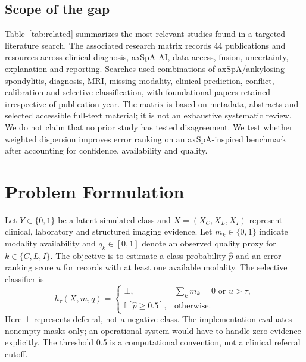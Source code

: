 \documentclass[conference]{IEEEtran}
\begin{document}
\subsection{Scope of the gap}
Table~\ref{tab:related} summarizes the most relevant studies found in a targeted literature search. The associated research matrix records 44 publications and resources across clinical diagnosis, axSpA AI, data access, fusion, uncertainty, explanation and reporting. Searches used combinations of axSpA/ankylosing spondylitis, diagnosis, MRI, missing modality, clinical prediction, conflict, calibration and selective classification, with foundational papers retained irrespective of publication year. The matrix is based on metadata, abstracts and selected accessible full-text material; it is not an exhaustive systematic review. We do not claim that no prior study has tested disagreement. We test whether weighted dispersion improves error ranking on an axSpA-inspired benchmark after accounting for confidence, availability and quality.
\section{Problem Formulation}
Let $Y\in\{0,1\}$ be a latent simulated class and $X=(X_C,X_L,X_I)$ represent clinical, laboratory and structured imaging evidence. Let $m_k\in\{0,1\}$ indicate modality availability and $q_k\in[0,1]$ denote an observed quality proxy for $k\in\{C,L,I\}$. The objective is to estimate a class probability $\hat p$ and an error-ranking score $u$ for records with at least one available modality. The selective classifier is
\begin{equation}
 h_\tau(X,m,q)=\begin{cases}\bot,&\sum_{k} m_k=0\text{ or }u>\tau,\\\mathbb{I}[\hat p\geq 0.5],&\text{otherwise}.\end{cases}
\end{equation}
Here $\bot$ represents deferral, not a negative class. The implementation evaluates nonempty masks only; an operational system would have to handle zero evidence explicitly. The threshold 0.5 is a computational convention, not a clinical referral cutoff.
\end{document}
